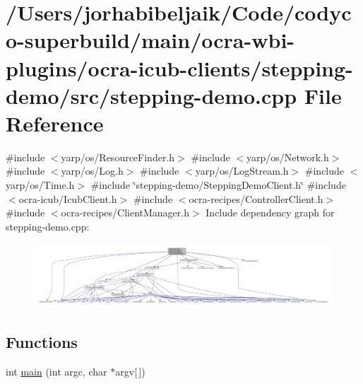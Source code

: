 \hypertarget{stepping-demo_8cpp}{}\section{/\+Users/jorhabibeljaik/\+Code/codyco-\/superbuild/main/ocra-\/wbi-\/plugins/ocra-\/icub-\/clients/stepping-\/demo/src/stepping-\/demo.cpp File Reference}
\label{stepping-demo_8cpp}
{\ttfamily \#include $<$yarp/os/\+Resource\+Finder.\+h$>$}\newline
{\ttfamily \#include $<$yarp/os/\+Network.\+h$>$}\newline
{\ttfamily \#include $<$yarp/os/\+Log.\+h$>$}\newline
{\ttfamily \#include $<$yarp/os/\+Log\+Stream.\+h$>$}\newline
{\ttfamily \#include $<$yarp/os/\+Time.\+h$>$}\newline
{\ttfamily \#include \char`\"{}stepping-\/demo/\+Stepping\+Demo\+Client.\+h\char`\"{}}\newline
{\ttfamily \#include $<$ocra-\/icub/\+Icub\+Client.\+h$>$}\newline
{\ttfamily \#include $<$ocra-\/recipes/\+Controller\+Client.\+h$>$}\newline
{\ttfamily \#include $<$ocra-\/recipes/\+Client\+Manager.\+h$>$}\newline
Include dependency graph for stepping-\/demo.cpp\+:\nopagebreak
\begin{figure}[H]
\begin{center}
\leavevmode
\includegraphics[width=350pt]{stepping-demo_8cpp__incl}
\end{center}
\end{figure}
\subsection*{Functions}
\begin{DoxyCompactItemize}
\item 
int \hyperlink{stepping-demo_8cpp_a0ddf1224851353fc92bfbff6f499fa97}{main} (int argc, char $\ast$argv\mbox{[}$\,$\mbox{]})
\end{DoxyCompactItemize}


